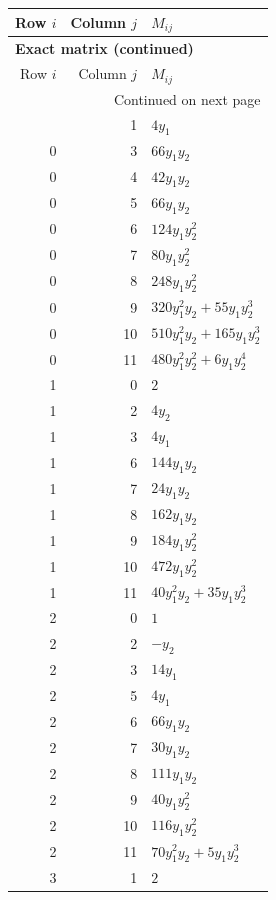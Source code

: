 \documentclass[10pt,a4paper]{article}
\begin{document}
{\small\setlength{\tabcolsep}{7pt}\begin{longtable}{rrp{125mm}}
\toprule Row $i$ & Column $j$ & $M_{ij}$\\\midrule\endfirsthead
\multicolumn{3}{l}{\textbf{Exact matrix (continued)}}\\
\toprule Row $i$ & Column $j$ & $M_{ij}$\\\midrule\endhead
\midrule\multicolumn{3}{r}{Continued on next page}\\\endfoot\bottomrule\endlastfoot
0 & 1 & $4 y_{1}$\\
0 & 3 & $66 y_{1} y_{2}$\\
0 & 4 & $42 y_{1} y_{2}$\\
0 & 5 & $66 y_{1} y_{2}$\\
0 & 6 & $124 y_{1} y_{2}^{2}$\\
0 & 7 & $80 y_{1} y_{2}^{2}$\\
0 & 8 & $248 y_{1} y_{2}^{2}$\\
0 & 9 & $320 y_{1}^{2} y_{2} + 55 y_{1} y_{2}^{3}$\\
0 & 10 & $510 y_{1}^{2} y_{2} + 165 y_{1} y_{2}^{3}$\\
0 & 11 & $480 y_{1}^{2} y_{2}^{2} + 6 y_{1} y_{2}^{4}$\\
1 & 0 & $2$\\
1 & 2 & $4 y_{2}$\\
1 & 3 & $4 y_{1}$\\
1 & 6 & $144 y_{1} y_{2}$\\
1 & 7 & $24 y_{1} y_{2}$\\
1 & 8 & $162 y_{1} y_{2}$\\
1 & 9 & $184 y_{1} y_{2}^{2}$\\
1 & 10 & $472 y_{1} y_{2}^{2}$\\
1 & 11 & $40 y_{1}^{2} y_{2} + 35 y_{1} y_{2}^{3}$\\
2 & 0 & $1$\\
2 & 2 & $- y_{2}$\\
2 & 3 & $14 y_{1}$\\
2 & 5 & $4 y_{1}$\\
2 & 6 & $66 y_{1} y_{2}$\\
2 & 7 & $30 y_{1} y_{2}$\\
2 & 8 & $111 y_{1} y_{2}$\\
2 & 9 & $40 y_{1} y_{2}^{2}$\\
2 & 10 & $116 y_{1} y_{2}^{2}$\\
2 & 11 & $70 y_{1}^{2} y_{2} + 5 y_{1} y_{2}^{3}$\\
3 & 1 & $2$\\

\end{longtable}}
\end{document}

